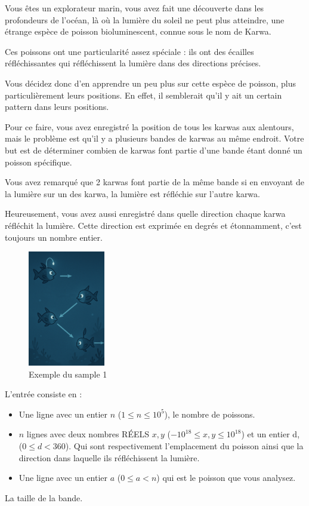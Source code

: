 \problemname{}



Vous êtes un explorateur marin, vous avez fait une découverte dans les profondeurs de l'océan, là où la lumière du soleil ne peut plus atteindre, une étrange espèce de poisson bioluminescent, connue sous le nom de Karwa.

Ces poissons ont une particularité assez spéciale : ils ont des écailles réfléchissantes qui réfléchissent la lumière dans des directions précises.

Vous décidez donc d'en apprendre un peu plus sur cette espèce de poisson, plus particulièrement leurs positions. En effet, il semblerait qu'il y ait un certain pattern dans leurs positions.

Pour ce faire, vous avez enregistré la position de tous les karwas aux alentours, mais le problème est qu'il y a plusieurs bandes de karwas au même endroit. Votre but est de déterminer combien de karwas font partie d'une bande étant donné un poisson spécifique.

Vous avez remarqué que 2 karwas font partie de la même bande si en envoyant de la lumière sur un des karwa, la lumière est réfléchie sur l'autre karwa.

Heureusement, vous avez aussi enregistré dans quelle direction chaque karwa réfléchit la lumière. Cette direction est exprimée en degrés et étonnamment, c'est toujours un nombre entier.

\smallskip
\begin{figure}[h]
    \centering
    \includegraphics[width=0.3\textwidth]{sample1.png}
    \caption{Exemple du sample 1}
\end{figure}

\begin{Input}
    L'entrée consiste en :
    \begin{itemize}
        \item Une ligne avec un entier $n$ ($1 \leq n \leq 10^{5}$), le nombre de poissons.
        \item $n$ lignes avec deux nombres RÉELS $x, y$ ($-10^{18} \leq x,y \leq {10^{18}}$) et un entier d, ($0 \leq d < 360$). Qui sont respectivement l'emplacement du poisson ainsi que la direction dans laquelle ils réfléchissent la lumière.
        \item Une ligne avec un entier $a$ ($0 \leq a < n$) qui est le poisson que vous analysez.
    \end{itemize}
\end{Input}

\begin{Output}
    La taille de la bande.
\end{Output}
